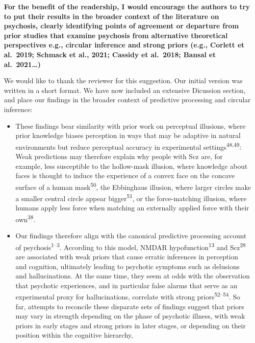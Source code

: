 \documentclass[
]{article}
\begin{document}
\textbf{For the benefit of the readership, I would encourage the authors
to try to put their results in the broader context of the literature on
psychosis, clearly identifying points of agreement or departure from
prior studies that examine psychosis from alternative theoretical
perspectives e.g., circular inference and strong priors (e.g., Corlett
et al.~2019; Schmack et al., 2021; Cassidy et al.~2018; Bansal et
al.~2021\ldots)}

We would like to thank the reviewer for this suggestion. Our initial
version was written in a short format. We have now included an extensive
Dicussion section, and place our findings in the broader context of
predictive processing and circular inference:

\begin{itemize}
\item
  These findings bear similarity with prior work on perceptual
  illusions, where prior knowledge biases perception in ways that may be
  adaptive in natural environments but reduce perceptual accuracy in
  experimental settings\textsuperscript{48,49}: Weak predictions may
  therefore explain why people with Scz are, for example, less
  susceptible to the hollow-mask illusion, where knowledge about faces
  is thought to induce the experience of a convex face on the concave
  surface of a human mask\textsuperscript{50}, the Ebbinghaus illusion,
  where larger circles make a smaller central circle appear
  bigger\textsuperscript{51}, or the force-matching illusion, where
  humans apply less force when matching an externally applied force with
  their own\textsuperscript{38}.
\item
  Our findings therefore align with the canonical predictive processing
  account of psychosis\textsuperscript{1--3}. According to this model,
  NMDAR hypofunction\textsuperscript{13} and Scz\textsuperscript{28} are
  associated with weak priors that cause erratic inferences in
  perception and cognition, ultimately leading to psychotic symptoms
  such as delusions and hallucinations. At the same time, they seem at
  odds with the observation that psychotic experiences, and in
  particular false alarms that serve as an experimental proxy for
  hallucinations, correlate with strong priors\textsuperscript{52--54}.
  So far, attempts to reconcile these disparate sets of findings suggest
  that priors may vary in strength depending on the phase of psychotic
  illness, with weak priors in early stages and strong priors in later
  stages, or depending on their position within the cognitive hierarchy,

\end{itemize}
\end{document}
